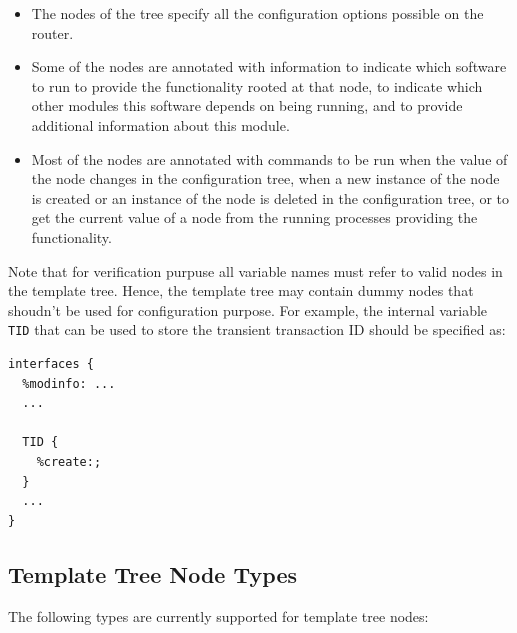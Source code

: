 \documentclass[11pt]{article}
\begin{document}
\begin{itemize}

  \item The nodes of the tree specify all the configuration options
possible on the router.

  \item Some of the nodes are annotated with information to indicate
which software to run to provide the functionality rooted at that
node, to indicate which other modules this software depends on
being running, and to provide additional information about this module.
\item Most of the nodes are annotated with commands to be run when the
value of the node changes in the configuration tree, when a new
instance of the node is created or an instance of the node is deleted
in the configuration tree, or to get the current value of a node from
the running processes providing the functionality.

\end{itemize}

Note that for verification purpuse all variable names must refer to valid
nodes in the template tree. Hence, the template tree may contain dummy nodes
that shoudn't be used for configuration purpose. For example, the internal
variable {\tt TID} that can be used to store the transient transaction ID
should be specified as:

\begin{verbatim}
interfaces {
  %modinfo: ...
  ...

  TID {
    %create:;
  }
  ...
}

\end{verbatim}

\newpage

\subsection{Template Tree Node Types}

The following types are currently supported for template tree nodes:
\end{document}
